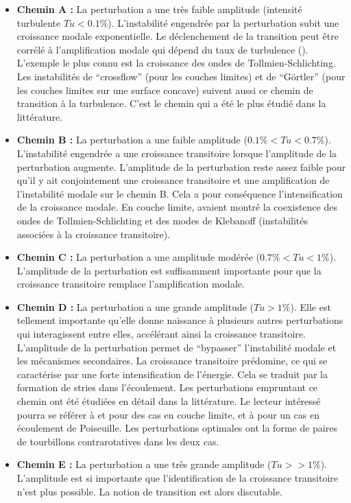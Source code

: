 \begin{itemize}
    \item \textbf{Chemin A :} La perturbation a une très faible amplitude (intensité turbulente $Tu<0.1\%$). L'instabilité engendrée par la perturbation subit une croissance modale exponentielle. Le déclenchement de la transition peut être corrélé à l'amplification modale qui dépend du taux de turbulence (\citet{mack1977}). L'exemple le plus connu est la croissance des ondes de Tollmien-Schlichting. Les instabilités de \foreignquote{french}{crossflow} (pour les couches limites) et de \foreignquote{french}{Görtler} (pour les couches limites sur une surface concave) suivent aussi ce chemin de transition à la turbulence. C'est le chemin qui a été le plus étudié dans la littérature. 

    \item \textbf{Chemin B :} La perturbation a une faible amplitude ($0.1\%<Tu<0.7\%$). L'instabilité engendrée a une croissance transitoire lorsque l'amplitude de la perturbation augmente. L'amplitude de la perturbation reste assez faible pour qu'il y ait conjointement une croissance transitoire et une amplification de l'instabilité modale sur le chemin B. Cela a pour conséquence l'intensification de la croissance modale. En couche limite, \citet{Kosorygin1990} avaient montré la coexistence des ondes de Tollmien-Schlichting et des modes de Klebanoff (instabilités associées à la croissance transitoire).

    \item \textbf{Chemin C :} La perturbation a une amplitude modérée ($0.7\%<Tu<1\%$). L'amplitude de la perturbation est suffisamment importante pour que la croissance transitoire remplace l'amplification modale.

    \item \textbf{Chemin D :} La perturbation a une grande amplitude ($Tu>1\%$). Elle est tellement importante qu'elle donne naissance à plusieurs autres perturbations qui interagissent entre elles, accélérant ainsi la croissance transitoire. L'amplitude de la perturbation permet de \foreignquote{french}{bypasser} l'instabilité modale et les mécanismes secondaires. La croissance transitoire prédomine, ce qui se caractérise par une forte intensification de l'énergie. Cela se traduit par la formation de stries dans l'écoulement. Les perturbations empruntant ce chemin ont été étudiées en détail dans la littérature. Le lecteur intéressé pourra se référer à \citet{Andersson1999} et \citet{Luchini2000} pour des cas en couche limite, et à \citet{Henningson1993} pour un cas en écoulement de Poiseuille. Les perturbations optimales ont la forme de paires de tourbillons contrarotatives dans les deux cas.

    \item \textbf{Chemin E :} La perturbation a une très grande amplitude ($Tu>>1\%$). L'amplitude est si importante que l'identification de la croissance transitoire n'est plus possible. La notion de transition est alors discutable.\\
\end{itemize}

